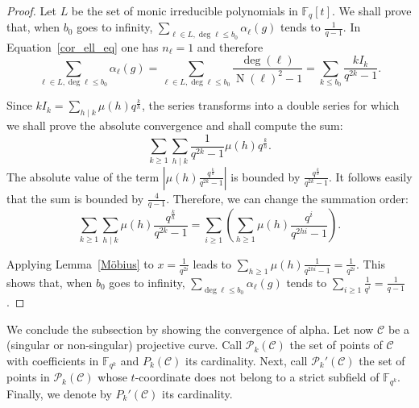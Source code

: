 \documentclass[a4wide]{article}
\newcommand{\F}{{\mathbb F}}
\DeclareMathOperator{\Norm}{N}
\theoremstyle{plain}
\theoremstyle{definition}
\theoremstyle{remark}
\begin{document}
\begin{proof}
	Let $L$ be the set of monic irreducible polynomials in $\F_q[t]$.
        We shall prove that, when $b_0$ goes to infinity, $\sum_{\ell\in L,\deg\ell\leq b_0}
           \alpha_\ell(g)$ tends to $\frac{1}{q-1}$.
	In Equation~\ref{cor_ell_eq} one has $n_\ell=1$ and therefore 
	\begin{equation}
	\sum_{\ell\in L,\deg\ell\leq b_0}\alpha_\ell(g)=
          \sum_{\ell \in L, \deg \ell \leq b_0}
		\frac{\deg(\ell)}{\Norm(\ell)^2-1}=
          \sum_{k\leq b_0}\frac{k I_k}{q^{2k}-1}.
\end{equation}

Since $kI_k=\sum_{h\mid k}\mu(h)q^\frac{k}{h}$, the series transforms into a
double series for which we shall prove the absolute convergence and shall
compute the sum: 
\begin{equation*}
\sum_{k\geq 1}\sum_{h\mid
k}\frac{1}{q^{2k}-1}\mu(h)q^\frac{k}{h}.
\end{equation*}
The absolute value of the term
$\left|\mu(h)\frac{q^{\frac{k}{h}}}{q^{2k}-1}\right|$
is bounded by 
$\frac{q^{\frac{k}{h}}}{q^{2k}-1}$. It follows easily that the sum is
bounded by $\frac{4}{q-1}$. 
Therefore, we can change the
summation order: 
\begin{equation}
	\label{moeb}
	\sum_{k\geq 1}\sum_{h\mid
	k}\mu(h)\frac{q^{\frac{k}{h}}}{q^{2k}-1 }=\sum_{i\geq 1}\left(\sum_{h\geq 1}\mu(h)\frac{q^i}{q^{2hi}-1}\right).
\end{equation}

Applying Lemma~\ref{Möbius} to $x=\frac{1}{q^{2i}}$ leads to $\sum_{h\geq
1}\mu(h)\frac{1}{q^{2hi}-1}=\frac{1}{q^{2i}}$. This shows that, when $b_0$
goes to infinity, $\sum_{\deg\ell\leq b_0}\alpha_\ell(g)$ tends to $\sum_{i\geq
1}\frac{1}{q^i}=\frac{1}{q-1}$. 

\end{proof}

We conclude the subsection by showing the convergence of alpha. Let now
$\mathcal{C}$ be a (singular or non-singular) projective curve. Call $\mathcal{P}_k(\mathcal{C})$ the set of points of
$\mathcal{C}$ with coefficients in $\F_{q^k}$ and $P_k(\mathcal{C})$ its
cardinality. Next, call $\mathcal{P}_k'(\mathcal{C})$ 
the set of points in $\mathcal{P}_k(\mathcal{C})$ whose $t$-coordinate does not
belong to a strict subfield of $\F_{q^k}$. Finally, we denote by 
$P_k'(\mathcal{C})$ its cardinality.
\end{document}
